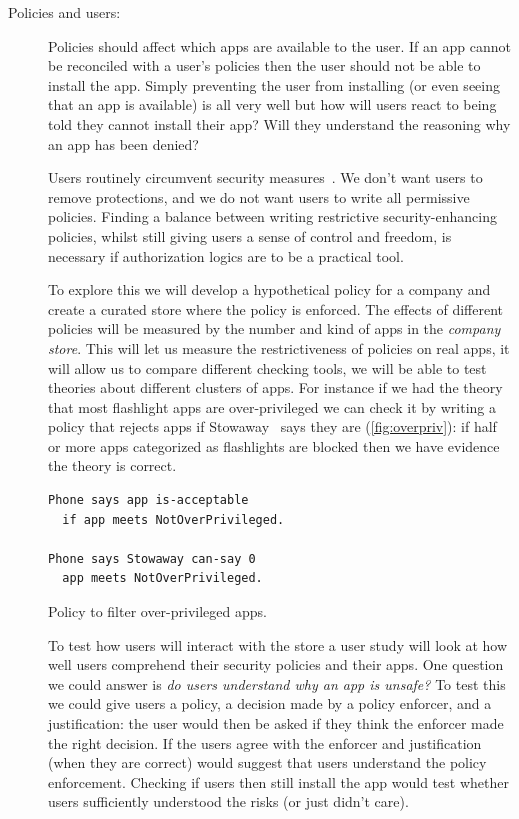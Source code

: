 \documentclass[a4paper,sfsidenotes]{%
  article%
}
\begin{document}
\begin{description}

  \item[Policies and users:] Policies should affect which apps are
    available to the user. If an app cannot be reconciled with a user's policies
    then the user should not be able to install the app.  Simply preventing the
    user from installing (or even seeing that an app is available) is all very
    well but how will users react to being told they cannot install their app?
    Will they understand the reasoning why an app has been denied?  
    
    Users routinely circumvent security measures~\cite{Blythe:2013dt}. We don't
    want users to remove protections, and we do not want users to write all
    permissive policies.  Finding a balance between writing restrictive
    security-enhancing policies, whilst still giving users a sense of control
    and freedom, is necessary if authorization logics are to be a practical
    tool.

    To explore this we will develop a hypothetical policy for a company and
    create a curated store where the policy is enforced.  The effects of
    different policies will be measured by the number and kind of apps in the
    \emph{company store}.  This will let us measure the restrictiveness of
    policies on real apps, it will allow us to compare different checking tools,
    we will be able to test theories about different clusters of apps.  For
    instance if we had the theory that most flashlight apps are over-privileged
    we can check it by writing a policy that rejects apps if
    Stowaway~\cite{Felt:2011kj} says they are (\autoref{fig:overpriv}): if
    half or more apps categorized as flashlights are blocked then we have
    evidence the theory is correct.

    \begin{marginfigure}
      \begin{lstlisting}[language=SecPAL]
Phone says app is-acceptable
  if app meets NotOverPrivileged.

Phone says Stowaway can-say 0
  app meets NotOverPrivileged.
      \end{lstlisting}
      \caption{Policy to filter over-privileged apps.}
      \label{fig:overpriv}
    \end{marginfigure}

    To test how users will interact with the store a user study will look at how
    well users comprehend their security policies and their apps.   One question
    we could answer is \emph{do users understand why an app is unsafe?}  To test
    this we could give users a policy, a decision made by a policy enforcer, and
    a justification:  the user would then be asked if they think the enforcer
    made the right decision.  If the users agree with the enforcer and
    justification (when they are correct) would suggest that users understand
    the policy enforcement.  Checking if users then still install the app would
    test whether users sufficiently understood the risks (or just didn't care).
    

\end{description}
\end{document}
